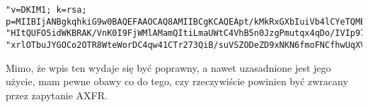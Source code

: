 \begin{lstlisting}
"v=DKIM1; k=rsa; p=MIIBIjANBgkqhkiG9w0BAQEFAAOCAQ8AMIIBCgKCAQEApt/kMkRxGXbIuiVb4lCYeTQMEOBKTXTUJya8aY659OB0feNIoA070AHq4M7/KKa4u/T/BfLNVNfyaK56S1E7S9o" "HItQUFO5idWKBRAK/VnK0I9FjWMlAMamQItiLmaUWtC4VhB5n0JzgPmutqx4qDo/IVIp97bWm3FDe4ts1zMNODxTTql52hkZ/X91/HrZYrC3qBLAg4rHbgBnJHWny55yt7vkgknyh7MAuN5qZDlN4s" "xrlOTbuJYGOCo2OTR8WteWorDC4qw41CTr273QiB/suVSZODeZD9xNKN6fmoFNCfhwUqXVzAiDVT0RcfNDmM1istoJyoVu56CCuHIJnowIDAQAB"
\end{lstlisting}

Mimo, że wpis ten wydaje się być poprawny, a nawet uzasadnione jest jego użycie, mam pewne obawy co do tego, czy rzeczywiście powinien być zwracany przez zapytanie AXFR.